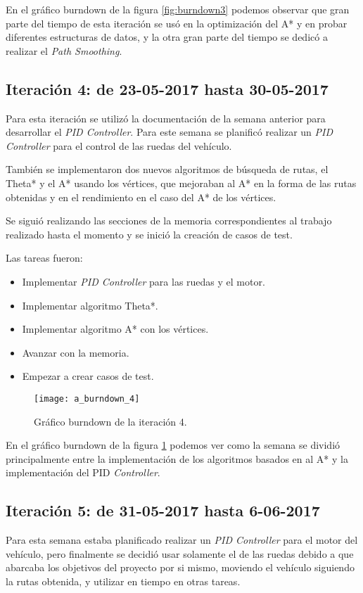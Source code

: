 En el gráfico burndown de la figura \ref{fig:burndown3} podemos observar que gran parte del tiempo de esta iteración se usó en la optimización del A* y en probar diferentes estructuras de datos, y la otra gran parte del tiempo se dedicó a realizar el \textit{Path Smoothing}.

\newpage
\subsection{Iteración 4: de 23-05-2017 hasta 30-05-2017}
Para esta iteración se utilizó la documentación de la semana anterior para desarrollar el \textit{PID Controller}. Para este semana se planificó realizar un \textit{PID Controller} para el control de las ruedas del vehículo.

También se implementaron dos nuevos algoritmos de búsqueda de rutas, el Theta* y el A* usando los vértices, que mejoraban al A* en la forma de las rutas obtenidas y en el rendimiento en el caso del A* de los vértices.

Se siguió realizando las secciones de la memoria correspondientes al trabajo realizado hasta el momento y se inició la creación de casos de test.

Las tareas fueron:
\begin{itemize}
\item Implementar \textit{PID Controller} para las ruedas y el motor.
\item Implementar algoritmo Theta*.
\item Implementar algoritmo A* con los vértices.
\item Avanzar con la memoria.
\item Empezar a crear casos de test.
\end{itemize}

\begin{figure}[htpb]
    \centering
    \texttt{[image: a\_burndown\_4]}
    \caption[Gráfico burndown de la iteración 4]{Gráfico burndown de la iteración 4.}
    \label{fig:burndown4}
\end{figure}

En el gráfico burndown de la figura \ref{fig:burndown4} podemos ver como la semana se dividió principalmente entre la implementación de los algoritmos basados en al A* y la implementación del PID \textit{Controller}.

\newpage
\subsection{Iteración 5: de 31-05-2017 hasta 6-06-2017}
Para esta semana estaba planificado realizar un \textit{PID Controller} para el motor del vehículo, pero finalmente se decidió usar solamente el de las ruedas debido a que abarcaba los objetivos del proyecto por si mismo, moviendo el vehículo siguiendo la rutas obtenida, y utilizar en tiempo en otras tareas.

